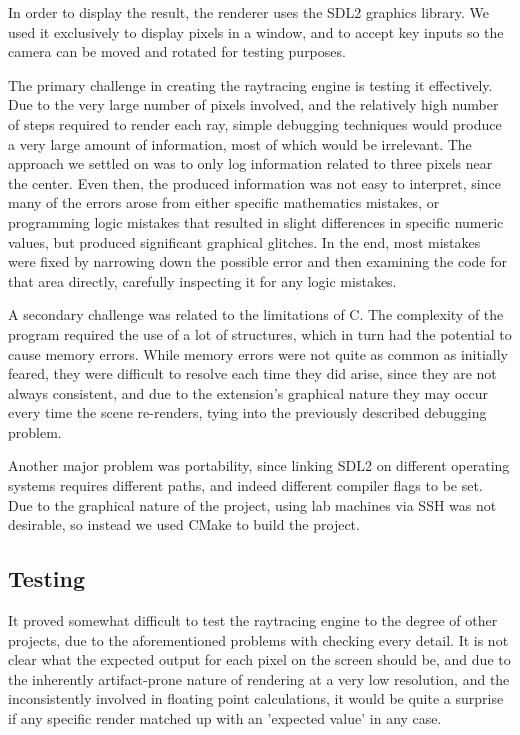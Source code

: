 \documentclass[11pt]{article}
\begin{document}
In order to display the result, the renderer uses the SDL2 graphics library. We used it exclusively to display pixels in a window, and to accept key inputs so the camera can be moved and rotated for testing purposes.

The primary challenge in creating the raytracing engine is testing it effectively. Due to the very large number of pixels involved, and the relatively high number of steps required to render each ray, simple debugging techniques would produce a very large amount of information, most of which would be irrelevant. The approach we settled on was to only log information related to three pixels near the center. Even then, the produced information was not easy to interpret, since many of the errors arose from either specific mathematics mistakes, or programming logic mistakes that resulted in slight differences in specific numeric values, but produced significant graphical glitches. In the end, most mistakes were fixed by narrowing down the possible error and then examining the code for that area directly, carefully inspecting it for any logic mistakes.

A secondary challenge was related to the limitations of C. The complexity of the program required the use of a lot of structures, which in turn had the potential to cause memory errors. While memory errors were not quite as common as initially feared, they were difficult to resolve each time they did arise, since they are not always consistent, and due to the extension's graphical nature they may occur every time the scene re-renders, tying into the previously described debugging problem.

Another major problem was portability, since linking SDL2 on different operating systems requires different paths, and indeed different compiler flags to be set. Due to the graphical nature of the project, using lab machines via SSH was not desirable, so instead we used CMake to build the project.

\subsection{Testing}

It proved somewhat difficult to test the raytracing engine to the degree of other projects, due to the aforementioned problems with checking every detail. It is not clear what the expected output for each pixel on the screen should be, and due to the inherently artifact-prone nature of rendering at a very low resolution, and the inconsistently involved in floating point calculations, it would be quite a surprise if any specific render matched up with an 'expected value' in any case.
\end{document}
